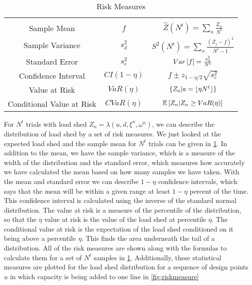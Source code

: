 \newcommand{\tabheight}{11pt}
\begin{table}
\centering
\begin{tabular}{| c | c | c|}
\hline
& & \\[1pt]
Sample Mean & $f$ &$ \hat{Z}(N^t)=\sum_n \frac{Z_n}{N^t} $\\[\tabheight]
Sample Variance & $s^2_d$ &$ S^2(N^t)=\sum_n \frac{\left(Z_j - f\right)^2}{N^t-1} $\\[\tabheight]
Standard Error & $s^2_e$ &$ Var\left[ f \right]= \frac{s^2_d}{N^t}$\\[\tabheight]
Confidence Interval& $CI(1-\eta)$  & $f \pm z_{1-\eta/2} \sqrt{s^2_e}$ \\[\tabheight]
Value at Risk & $ VaR(\eta)$& $ \left\{ Z_{a} |  a = \lfloor  \eta N^t  \rfloor\right\} $\\[\tabheight]  %
Conditional Value at Risk & $ CVaR(\eta)$& $\mathbb{E}\left[ Z_n | Z_n \geq VaR(\eta) \right]$ \\[\tabheight]
\hline
\end{tabular}
\caption{Risk Measures}\label{tab:risk}
\end{table}

For $N^t$ trials with load shed $Z_n = \lambda (u,d,\xi^n,\omega^n )$, we can describe the distribution of load shed by a set of risk measures.  We just looked at the expected load shed and the sample mean for $N^t$ trials can be given in \cref{tab:risk}.  In addition to the mean, we have the sample variance, which is a measure of the width of the distribution and the standard error, which measures how accurately we have calculated the mean based on how many samples we have taken.  With the mean and standard error we can describe $1-\eta$ confidence intervals, which says that the mean will be within a given range at least $1-\eta$ percent of the time.  This confidence interval is calculated using the inverse of the standard normal distribution.  The value at risk is a measure of the percentile of the distribution, so that the $\eta$ value at risk is the value of the load shed at percentile $\eta$.  The conditional value at risk is the expectation of the load shed conditioned on it being above a percentile $\eta$.  This finds the area underneath the tail of a distribution.  All of the risk measures are shown along with the formulas to calculate them for a set of $N^t$ samples in \cref{tab:risk}.  Additionally, these statistical measures are plotted for the load shed distribution for a sequence of design points $u$ in which capacity is being added to one line in \cref{fig:riskmeasure}

